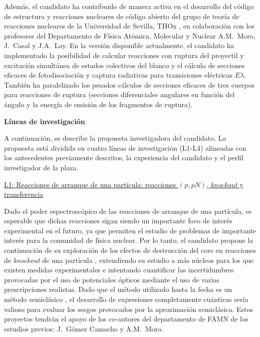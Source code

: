 \documentclass[a4paper,12pt,twoside]{article}
\begin{document}
Además, el candidato ha contribuido de manera activa en el desarrollo del código de estructura y reacciones nucleares de código abierto del grupo de teoría de reacciones nucleares de la Universidad de Sevilla, THOx \cite{thox}, en colaboración con los profesores del Departamento de Física Atómica, Molecular y Nuclear A.M.~Moro, J.~Casal y J.A.~Lay. En la versión disponible actualmente, el candidato ha implementado la posibilidad de calcular reacciones con ruptura del proyectil y excitación simultánea de estados colectivos del blanco \cite{texc} y el cálculo de secciones eficaces de fotodisociación y captura radiativas para transiciones eléctricas $E\lambda$. También ha paralelizado los pesados cálculos de secciones eficaces de tres cuerpos para reacciones de ruptura (secciones diferenciales angulares en función del ángulo y la energía de emisión de los fragmentos de ruptura).


\textbf{Líneas de investigación}

A continuación, se describe la propuesta investigadora del candidato. La propuesta
está dividida en cuatro líneas de investigación (L1-L4) alineadas con los antecedentes previamente descritos, la experiencia del candidato y el perfil investigador de la plaza.

\underline{L1: Reacciones de arranque de una partícula: reacciones $(p,pN)$, \textit{knockout} y} \newline \underline{transferencia}

Dado el poder espectroscópico de las reacciones de arranque de una partícula, es esperable que dichas reacciones sigan siendo un importante foco de interés experimental en el futuro, ya que permiten el estudio de problemas de importante interés para la comunidad de física nuclear. Por lo tanto, el candidato propone la continuación de su exploración de los efectos de destrucción del core en reacciones de \textit{knockout} de una partícula \cite{quenching}, extendiendo su estudio a más núcleos para los que existen medidas experimentales \cite{Tos21} e intentando cuantificar las incertidumbres provocadas por el uso de potenciales ópticos mediante el uso de varias prescripciones realistas. Dado que el método utilizado hasta la fecha es un método semiclásico \cite{quenching}, el desarrollo de expresiones completamente cuánticas sería valioso para evaluar los sesgos provocados por la aproximación semiclásica. Estos proyectos tendrán el apoyo de los co-autores del departamento de FAMN de los estudios previos: J.~Gómez Camacho y A.M.~Moro.
\end{document}
